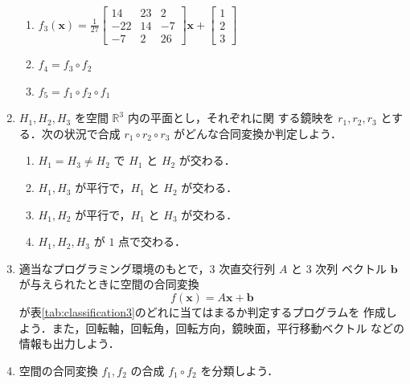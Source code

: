 \documentclass[11pt, uplatex, dvipdfmx, titlepage]{jsarticle}
\newcommand{\ds}{\displaystyle}
\theoremstyle{definition}
\begin{document}
\begin{enumerate}
\begin{enumerate}[(1)]
  \item $\ds f_3(\bm{x}) = \frac{1}{27}\left[
      \begin{array}{rrr}
        14 & 23 & 2\\
        -22 & 14 & -7\\
        -7 & 2 & 26
      \end{array}
    \right] \bm{x} + \left[
      \begin{array}{r}
        1\\
        2\\
        3
      \end{array}
    \right]$

  \item $f_4=f_3 \circ f_2$

  \item $f_5=f_1 \circ f_2 \circ f_1$
  \end{enumerate}

\item $H_1, H_2, H_3$ を空間 $\mathbb{R}^3$ 内の平面とし，それぞれに関
  する鏡映を $r_1, r_2 , r_3$ とする．次の状況で合成 $r_1 \circ r_2
  \circ r_3$ がどんな合同変換か判定しよう．

  \vspace{.5zh}

  \begin{enumerate}[(1)]
  \item $H_1 = H_3 \neq H_2$ で $H_1$ と $H_2$ が交わる．

  \item $H_1, H_3$ が平行で，$H_1$ と $H_2$ が交わる．

  \item $H_1, H_2$ が平行で，$H_1$ と $H_3$ が交わる．

  \item $H_1, H_2, H_3$ が $1$ 点で交わる．
  \end{enumerate}
  
\item 適当なプログラミング環境のもとで，$3$ 次直交行列 $A$ と $3$ 次列
  ベクトル $\bm{b}$ が与えられたときに空間の合同変換
  \[
    f(\bm{x}) = A\bm{x} + \bm{b}
  \]
  が表\ref{tab:classification3}のどれに当てはまるか判定するプログラムを
  作成しよう．また，回転軸，回転角，回転方向，鏡映面，平行移動ベクトル
  などの情報も出力しよう．

\item 空間の合同変換 $f_1, f_2$ の合成 $f_1 \circ f_2$ を分類しよう．
\end{enumerate}
\end{document}
